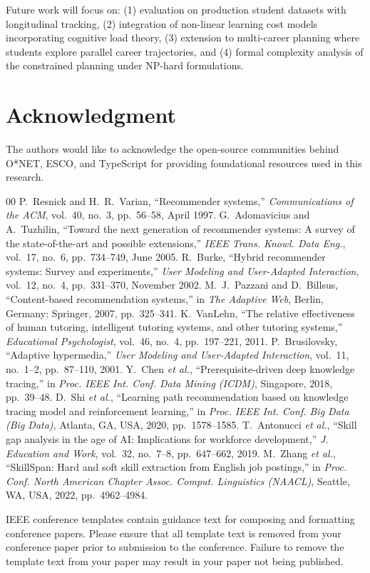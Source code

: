 \documentclass[conference]{IEEEtran}
\begin{document}
Future work will focus on: (1) evaluation on production student datasets with longitudinal tracking, (2) integration of non-linear learning cost models incorporating cognitive load theory, (3) extension to multi-career planning where students explore parallel career trajectories, and (4) formal complexity analysis of the constrained planning under NP-hard formulations.

\section*{Acknowledgment}

The authors would like to acknowledge the open-source communities behind O*NET, ESCO, and TypeScript for providing foundational resources used in this research.

\begin{thebibliography}{00}
     P.~Resnick and H.~R.~Varian, ``Recommender systems,'' \emph{Communications of the ACM}, vol.~40, no.~3, pp.~56--58, April 1997.
     G.~Adomavicius and A.~Tuzhilin, ``Toward the next generation of recommender systems: A survey of the state-of-the-art and possible extensions,'' \emph{IEEE Trans. Knowl. Data Eng.}, vol.~17, no.~6, pp.~734--749, June 2005.
     R.~Burke, ``Hybrid recommender systems: Survey and experiments,'' \emph{User Modeling and User-Adapted Interaction}, vol.~12, no.~4, pp.~331--370, November 2002.
     M.~J.~Pazzani and D.~Billsus, ``Content-based recommendation systems,'' in \emph{The Adaptive Web}, Berlin, Germany: Springer, 2007, pp.~325--341.
     K.~VanLehn, ``The relative effectiveness of human tutoring, intelligent tutoring systems, and other tutoring systems,'' \emph{Educational Psychologist}, vol.~46, no.~4, pp.~197--221, 2011.
     P.~Brusilovsky, ``Adaptive hypermedia,'' \emph{User Modeling and User-Adapted Interaction}, vol.~11, no.~1--2, pp.~87--110, 2001.
     Y.~Chen \emph{et al.}, ``Prerequisite-driven deep knowledge tracing,'' in \emph{Proc. IEEE Int. Conf. Data Mining (ICDM)}, Singapore, 2018, pp.~39--48.
     D.~Shi \emph{et al.}, ``Learning path recommendation based on knowledge tracing model and reinforcement learning,'' in \emph{Proc. IEEE Int. Conf. Big Data (Big Data)}, Atlanta, GA, USA, 2020, pp.~1578--1585.
     T.~Antonucci \emph{et al.}, ``Skill gap analysis in the age of AI: Implications for workforce development,'' \emph{J. Education and Work}, vol.~32, no.~7--8, pp.~647--662, 2019.
     M.~Zhang \emph{et al.}, ``SkillSpan: Hard and soft skill extraction from English job postings,'' in \emph{Proc. Conf. North American Chapter Assoc. Comput. Linguistics (NAACL)}, Seattle, WA, USA, 2022, pp.~4962--4984.
\end{thebibliography}

\vspace{12pt}
\color{red}
IEEE conference templates contain guidance text for composing and formatting conference papers. Please ensure that all template text is removed from your conference paper prior to submission to the conference. Failure to remove the template text from your paper may result in your paper not being published.
\end{document}
